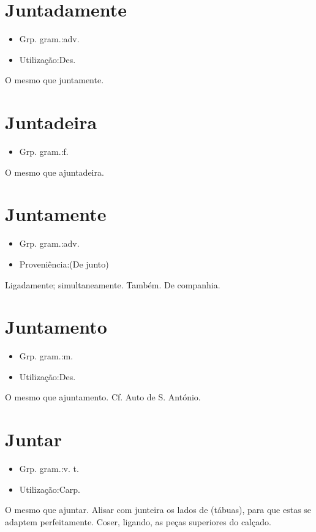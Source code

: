 \documentclass{article}
\begin{document}
\section{Juntadamente}
\begin{itemize}
\item {Grp. gram.:adv.}
\end{itemize}
\begin{itemize}
\item {Utilização:Des.}
\end{itemize}
O mesmo que \textunderscore juntamente\textunderscore .
\section{Juntadeira}
\begin{itemize}
\item {Grp. gram.:f.}
\end{itemize}
O mesmo que \textunderscore ajuntadeira\textunderscore .
\section{Juntamente}
\begin{itemize}
\item {Grp. gram.:adv.}
\end{itemize}
\begin{itemize}
\item {Proveniência:(De \textunderscore junto\textunderscore )}
\end{itemize}
Ligadamente; simultaneamente.
Também.
De companhia.
\section{Juntamento}
\begin{itemize}
\item {Grp. gram.:m.}
\end{itemize}
\begin{itemize}
\item {Utilização:Des.}
\end{itemize}
O mesmo que \textunderscore ajuntamento\textunderscore . Cf. \textunderscore Auto de S. António\textunderscore .
\section{Juntar}
\begin{itemize}
\item {Grp. gram.:v. t.}
\end{itemize}
\begin{itemize}
\item {Utilização:Carp.}
\end{itemize}
O mesmo que \textunderscore ajuntar\textunderscore .
Alisar com junteira os lados de (tábuas), para que estas se adaptem perfeitamente.
Coser, ligando, as peças superiores do calçado.
\end{document}

